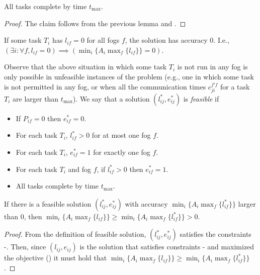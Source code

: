 \begin{lemma}
\label{lem:tmax}
    All tasks complete by time $t_{\max}$.
\end{lemma}
\begin{proof}
    The claim follows from the previous lemma and .
\end{proof}

\begin{observation}
If some task $T_i$ has $l_{if}=0$ for all fogs $f$, the solution has accuracy $0$. I.e., $(\exists i: \forall f, l_{if}=0) \implies (\min_i \{A_i \max_f \{ l_{if} \} \} = 0)$.
\end{observation}

Observe that the above situation in which some task $T_i$ is not run in any fog is only possible in unfeasible instances of the problem (e.g., one in which some task is not permitted in any fog, or when all the communication times $c_{ji}^{f'f}$ for a task $T_i$ are larger than $t_{\max}$). We say that a solution $(l_{ij}^*, e_{ij}^*)$ is \textit{feasible} if
\begin{itemize}
    \item If $P_{if}=0$ then $e_{if}^*=0$.
    \item For each task $T_i$, $l_{if}^*>0$ for at most one fog $f$.
    \item For each task $T_i$, $e_{if}^*=1$ for exactly one fog $f$.
    \item For each task $T_i$ and fog $f$, if $l_{if}^* >0$ then $e_{if}^* = 1$.
    \item All tasks complete by time $t_{\max}$.
\end{itemize} 

\begin{lemma}
\label{lem:feasible}
If there is a feasible solution $(l_{ij}^*, e_{ij}^*)$ with accuracy $\min_i \{A_i \max_f \{ l_{if}^* \} \}$ larger than $0$, then $\min_i \{A_i \max_f \{ l_{if} \} \} \geq \min_i \{A_i \max_f \{ l_{if}^* \} \} >0$.
\end{lemma}
\begin{proof}
From the definition of feasible solution, $(l_{ij}^*, e_{ij}^*)$ satisfies the constraints -. Then, since $(l_{ij}, e_{ij})$ is the solution that satisfies constraints - and maximized the objective () it must hold that $\min_i \{A_i \max_f \{ l_{if} \} \} \geq \min_i \{A_i \max_f \{ l_{if}^* \} \}$.
\end{proof}


